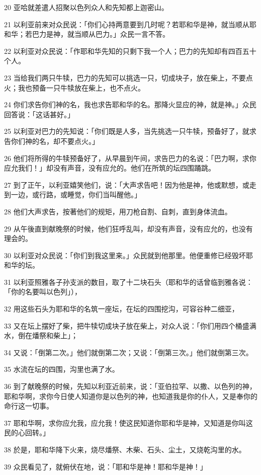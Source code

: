 \par 20 亚哈就差遣人招聚以色列众人和先知都上迦密山。
\par 21 以利亚前来对众民说：「你们心持两意要到几时呢？若耶和华是神，就当顺从耶和华；若巴力是神，就当顺从巴力。」众民一言不答。
\par 22 以利亚对众民说：「作耶和华先知的只剩下我一个人；巴力的先知却有四百五十个人。
\par 23 当给我们两只牛犊，巴力的先知可以挑选一只，切成块子，放在柴上，不要点火；我也预备一只牛犊放在柴上，也不点火。
\par 24 你们求告你们神的名，我也求告耶和华的名。那降火显应的神，就是神。」众民回答说：「这话甚好。」
\par 25 以利亚对巴力的先知说：「你们既是人多，当先挑选一只牛犊，预备好了，就求告你们神的名，却不要点火。」
\par 26 他们将所得的牛犊预备好了，从早晨到午间，求告巴力的名说：「巴力啊，求你应允我们！」却没有声音，没有应允的。他们在所筑的坛四围踊跳。
\par 27 到了正午，以利亚嬉笑他们，说：「大声求告吧！因为他是神，他或默想，或走到一边，或行路，或睡觉，你们当叫醒他。」
\par 28 他们大声求告，按著他们的规矩，用刀枪自割、自刺，直到身体流血。
\par 29 从午後直到献晚祭的时候，他们狂呼乱叫，却没有声音，没有应允的，也没有理会的。
\par 30 以利亚对众民说：「你们到我这里来。」众民就到他那里。他便重修已经毁坏耶和华的坛。
\par 31 以利亚照雅各子孙支派的数目，取了十二块石头（耶和华的话曾临到雅各说：「你的名要叫以色列」），
\par 32 用这些石头为耶和华的名筑一座坛，在坛的四围挖沟，可容谷种二细亚，
\par 33 又在坛上摆好了柴，把牛犊切成块子放在柴上，对众人说：「你们用四个桶盛满水，倒在燔祭和柴上」；
\par 34 又说：「倒第二次。」他们就倒第二次；又说：「倒第三次。」他们就倒第三次。
\par 35 水流在坛的四围，沟里也满了水。
\par 36 到了献晚祭的时候，先知以利亚近前来，说：「亚伯拉罕、以撒、以色列的神，耶和华啊，求你今日使人知道你是以色列的神，也知道我是你的仆人，又是奉你的命行这一切事。
\par 37 耶和华啊，求你应允我，应允我！使这民知道你耶和华是神，又知道是你叫这民的心回转。」
\par 38 於是，耶和华降下火来，烧尽燔祭、木柴、石头、尘土，又烧乾沟里的水。
\par 39 众民看见了，就俯伏在地，说：「耶和华是神！耶和华是神！」
